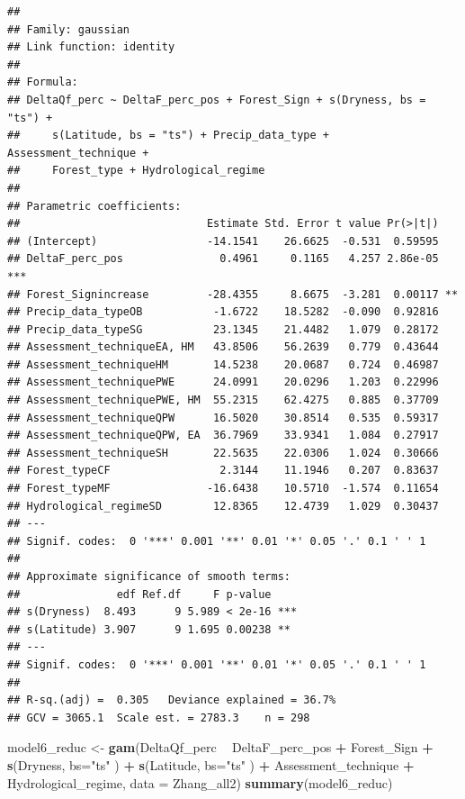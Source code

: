 \documentclass[]{elsarticle} %
\newenvironment{Shaded}{\begin{snugshade}}{\end{snugshade}}
\newcommand{\DataTypeTok}[1]{\textcolor[rgb]{0.13,0.29,0.53}{#1}}
\newcommand{\KeywordTok}[1]{\textcolor[rgb]{0.13,0.29,0.53}{\textbf{#1}}}
\newcommand{\NormalTok}[1]{#1}
\newcommand{\OperatorTok}[1]{\textcolor[rgb]{0.81,0.36,0.00}{\textbf{#1}}}
\newcommand{\StringTok}[1]{\textcolor[rgb]{0.31,0.60,0.02}{#1}}
\begin{document}
\begin{verbatim}
## 
## Family: gaussian 
## Link function: identity 
## 
## Formula:
## DeltaQf_perc ~ DeltaF_perc_pos + Forest_Sign + s(Dryness, bs = "ts") + 
##     s(Latitude, bs = "ts") + Precip_data_type + Assessment_technique + 
##     Forest_type + Hydrological_regime
## 
## Parametric coefficients:
##                             Estimate Std. Error t value Pr(>|t|)    
## (Intercept)                 -14.1541    26.6625  -0.531  0.59595    
## DeltaF_perc_pos               0.4961     0.1165   4.257 2.86e-05 ***
## Forest_Signincrease         -28.4355     8.6675  -3.281  0.00117 ** 
## Precip_data_typeOB           -1.6722    18.5282  -0.090  0.92816    
## Precip_data_typeSG           23.1345    21.4482   1.079  0.28172    
## Assessment_techniqueEA, HM   43.8506    56.2639   0.779  0.43644    
## Assessment_techniqueHM       14.5238    20.0687   0.724  0.46987    
## Assessment_techniquePWE      24.0991    20.0296   1.203  0.22996    
## Assessment_techniquePWE, HM  55.2315    62.4275   0.885  0.37709    
## Assessment_techniqueQPW      16.5020    30.8514   0.535  0.59317    
## Assessment_techniqueQPW, EA  36.7969    33.9341   1.084  0.27917    
## Assessment_techniqueSH       22.5635    22.0306   1.024  0.30666    
## Forest_typeCF                 2.3144    11.1946   0.207  0.83637    
## Forest_typeMF               -16.6438    10.5710  -1.574  0.11654    
## Hydrological_regimeSD        12.8365    12.4739   1.029  0.30437    
## ---
## Signif. codes:  0 '***' 0.001 '**' 0.01 '*' 0.05 '.' 0.1 ' ' 1
## 
## Approximate significance of smooth terms:
##               edf Ref.df     F p-value    
## s(Dryness)  8.493      9 5.989 < 2e-16 ***
## s(Latitude) 3.907      9 1.695 0.00238 ** 
## ---
## Signif. codes:  0 '***' 0.001 '**' 0.01 '*' 0.05 '.' 0.1 ' ' 1
## 
## R-sq.(adj) =  0.305   Deviance explained = 36.7%
## GCV = 3065.1  Scale est. = 2783.3    n = 298
\end{verbatim}

\begin{Shaded}
\begin{Highlighting}[]
\NormalTok{model6_reduc <-}\StringTok{ }\KeywordTok{gam}\NormalTok{(DeltaQf_perc }\OperatorTok{~}\StringTok{ }\NormalTok{DeltaF_perc_pos }\OperatorTok{+}\StringTok{ }\NormalTok{Forest_Sign }\OperatorTok{+}\StringTok{ }
\StringTok{                    }\KeywordTok{s}\NormalTok{(Dryness, }\DataTypeTok{bs=}\StringTok{"ts"}\NormalTok{ ) }\OperatorTok{+}\StringTok{ }\KeywordTok{s}\NormalTok{(Latitude, }\DataTypeTok{bs=}\StringTok{"ts"}\NormalTok{ ) }\OperatorTok{+}\StringTok{ }
\StringTok{                    }\NormalTok{Assessment_technique }\OperatorTok{+}
\StringTok{                    }\NormalTok{Hydrological_regime, }\DataTypeTok{data =}\NormalTok{ Zhang_all2)}
\KeywordTok{summary}\NormalTok{(model6_reduc)}
\end{Highlighting}
\end{Shaded}
\end{document}
